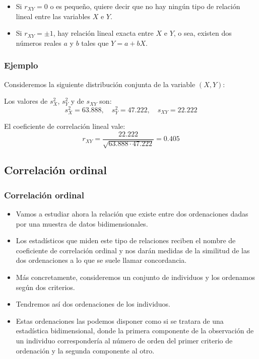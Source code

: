 \begin{frame}
\begin{itemize}
\item Si  $r_{XY}=0$ o es pequeño, quiere decir que no hay ningún tipo de relación lineal
  entre las variables $X$ e $Y$.

\item Si $r_{XY}=\pm 1$, hay relación lineal exacta entre $X$ e $Y$, o sea,
 existen dos números reales
$a$ y $b$    tales que $Y=a + b X$.
\end{itemize}
\end{frame}

\begin{frame}
\frametitle{Ejemplo}
Consideremos la siguiente distribución conjunta de la variable $(X,Y)$:

Los valores de $s^2_X$, $s^2_Y$ y de $s_{XY}$ son:
$$
s^2_X= 63.888,\quad s^2_Y= 47.222,\quad s_{XY}= 22.222
$$

El coeficiente de correlación lineal vale:
$$r_{XY}=\frac{22.222}{\sqrt{63.888 \cdot 47.222}}
=0.405$$
\end{frame}

\subsection{Correlación ordinal}

\begin{frame}
\frametitle{Correlación ordinal}
\begin{itemize}
\item Vamos a estudiar ahora la relación que existe entre dos  ordenaciones dadas por una
muestra de datos bidimensionales.
\item 
Los estadísticos que miden este tipo de relaciones reciben el nombre de coeficiente de
correlación ordinal y  nos darán  medidas de la similitud de las dos ordenaciones a lo
que se suele llamar concordancia.
\item 
Más concretamente, consideremos un conjunto de individuos  y los ordenamos según dos
criterios.
\end{itemize}
\end{frame}

\begin{frame}
\begin{itemize}
\item  Tendremos así dos ordenaciones de los individuos.
\item  Estas ordenaciones las
podemos disponer como si se tratara de una estadística bidimensional, donde la primera
componente de la observación de un individuo correspondería al número de orden del primer
criterio de ordenación y la segunda componente al otro.
\end{itemize}
\end{frame}

